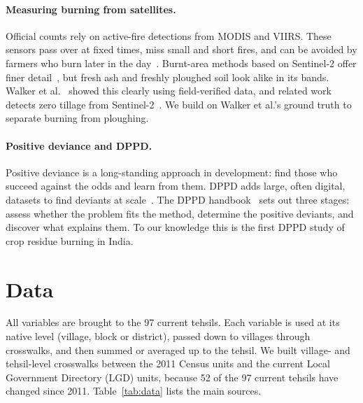 \documentclass[sigconf,nonacm]{acmart}
\begin{document}
\paragraph{Measuring burning from satellites.} Official counts rely on active-fire detections from MODIS and VIIRS. These sensors pass over at fixed times, miss small and short fires, and can be avoided by farmers who burn later in the day~\cite{vadrevu2018viirs}. Burnt-area methods based on Sentinel-2 offer finer detail~\cite{arbain2025sentinel}, but fresh ash and freshly ploughed soil look alike in its bands. Walker et al.~\cite{walker2022detecting} showed this clearly using field-verified data, and related work detects zero tillage from Sentinel-2~\cite{deshpande2024zerotill,naeher2025zerotill}. We build on Walker et al.'s ground truth to separate burning from ploughing.

\paragraph{Positive deviance and DPPD.} Positive deviance is a long-standing approach in development: find those who succeed against the odds and learn from them. DPPD adds large, often digital, datasets to find deviants at scale~\cite{albanna2022dppd}. The DPPD handbook~\cite{dppd2021handbook} sets out three stages: assess whether the problem fits the method, determine the positive deviants, and discover what explains them. To our knowledge this is the first DPPD study of crop residue burning in India.

\section{Data}
\label{sec:data}

All variables are brought to the 97 current tehsils. Each variable is used at its native level (village, block or district), passed down to villages through crosswalks, and then summed or averaged up to the tehsil. We built village- and tehsil-level crosswalks between the 2011 Census units and the current Local Government Directory (LGD) units, because 52 of the 97 current tehsils have changed since 2011. Table~\ref{tab:data} lists the main sources.
\end{document}
